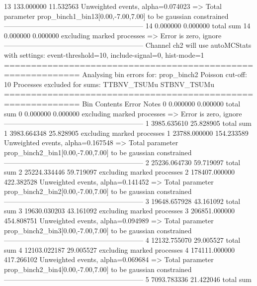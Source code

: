 13         133.000000      11.532563       Unweighted events, alpha=0.074023
  => Total parameter prop_binch1_bin13[0.00,-7.00,7.00] to be gaussian constrained
------------------------------------------------------------
14         0.000000        0.000000        total sum                     
14         0.000000        0.000000        excluding marked processes    
  => Error is zero, ignore      
------------------------------------------------------------
Channel ch2 will use autoMCStats with settings: event-threshold=10, include-signal=0, hist-mode=1
============================================================
Analysing bin errors for: prop_binch2
Poisson cut-off: 10
Processes excluded for sums: TTBNV_TSUMu STBNV_TSUMu
============================================================
Bin        Contents        Error           Notes                         
0          0.000000        0.000000        total sum                     
0          0.000000        0.000000        excluding marked processes    
  => Error is zero, ignore      
------------------------------------------------------------
1          3985.635610     25.828905       total sum                     
1          3983.664348     25.828905       excluding marked processes    
1          23788.000000    154.233589      Unweighted events, alpha=0.167548
  => Total parameter prop_binch2_bin1[0.00,-7.00,7.00] to be gaussian constrained
------------------------------------------------------------
2          25236.064730    59.719097       total sum                     
2          25224.334446    59.719097       excluding marked processes    
2          178407.000000   422.382528      Unweighted events, alpha=0.141452
  => Total parameter prop_binch2_bin2[0.00,-7.00,7.00] to be gaussian constrained
------------------------------------------------------------
3          19648.657928    43.161092       total sum                     
3          19630.030203    43.161092       excluding marked processes    
3          206851.000000   454.808751      Unweighted events, alpha=0.094989
  => Total parameter prop_binch2_bin3[0.00,-7.00,7.00] to be gaussian constrained
------------------------------------------------------------
4          12132.755070    29.005527       total sum                     
4          12103.022187    29.005527       excluding marked processes    
4          174111.000000   417.266102      Unweighted events, alpha=0.069684
  => Total parameter prop_binch2_bin4[0.00,-7.00,7.00] to be gaussian constrained
------------------------------------------------------------
5          7093.783336     21.422046       total sum                     
